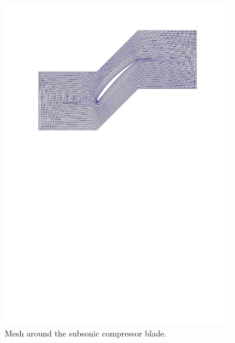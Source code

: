 \begin{figure}[htbp]
\begin{center}
\includegraphics[width=0.9\textwidth,viewport=24 495 570 817]{../2D/turbo_sc10/mesh.pdf}
\end{center}
\caption{Mesh around the subsonic compressor blade.}
\label{turbo-sc10-meshfig}
\end{figure}


